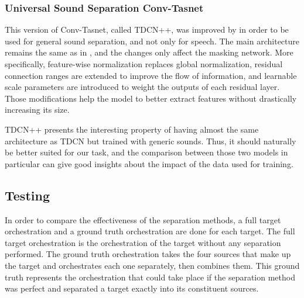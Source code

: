\documentclass{article}
\begin{document}
			\subsubsection{Universal Sound Separation Conv-Tasnet}
			This version of Conv-Tasnet, called TDCN++, was improved by \cite{tdcnpp} in order to be used for general sound separation, and not only for speech. The main architecture remains the same as in \cite{tdcn}, and the changes only affect the masking network. More specifically, feature-wise normalization replaces global normalization, residual connection ranges are extended to improve the flow of information, and learnable scale parameters are introduced to weight the outputs of each residual layer. Those modifications help the model to better extract features without drastically increasing its size.
			
			TDCN++ presents the interesting property of having almost the same architecture as TDCN but trained with generic sounds. Thus, it should naturally be better suited for our task, and the comparison between those two models in particular can give good insights about the impact of the data used for training.
	
		\subsection{Testing}
		In order to compare the effectiveness of the separation methods, a full target orchestration and a ground truth orchestration are done for each target. The full target orchestration is the orchestration of the target without any separation performed. The ground truth orchestration takes the four sources that make up the target and orchestrates each one separately, then combines them. This ground truth represents the orchestration that could take place if the separation method was perfect and separated a target exactly into its constituent sources. 
		
\end{document}
